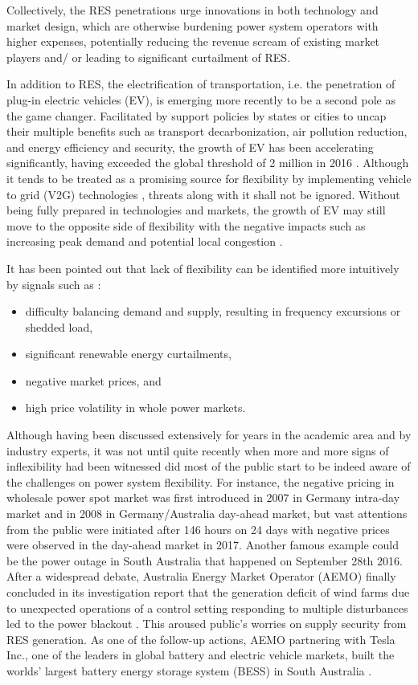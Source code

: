 Collectively, the RES penetrations urge innovations in both technology and market design, which are otherwise burdening power system operators with higher expenses, potentially reducing the revenue scream of existing market players and/ or leading to significant curtailment of RES.

In addition to RES, the electrification of transportation, i.e. the penetration of plug-in electric vehicles (EV), is emerging more recently to be a second pole as the game changer. Facilitated by support policies by states or cities to uncap their multiple benefits such as transport decarbonization, air pollution reduction, and energy efficiency and security, the growth of EV has been accelerating significantly, having exceeded the global threshold of 2 million in 2016 \cite{InternationalEnergyAgency2017}. Although it tends to be treated as a promising source for flexibility by implementing vehicle to grid (V2G) technologies \cite{Size2016,Habib2015,Foley2013}, threats along with it shall not be ignored. Without being fully prepared in technologies and markets, the growth of EV may still move to the opposite side of flexibility with the negative impacts such as increasing peak demand and potential local congestion \cite{Green2011,DBLP:journals/corr/PournarasJZFS17}.

It has been pointed out that lack of flexibility can be identified more intuitively by signals such as \cite{Cochran2014,Wang2017}:
\begin{itemize}
	\item difficulty balancing demand and supply, resulting in frequency excursions or shedded load,
	\item significant renewable energy curtailments,
	\item negative market prices, and
	\item high price volatility in whole power markets.
\end{itemize}

Although having been discussed extensively for years in the academic area and by industry experts, it was not until quite recently when more and more signs of inflexibility had been witnessed did most of the public start to be indeed aware of the challenges on power system flexibility. For instance, the negative pricing in wholesale power spot market was first introduced in 2007 in Germany intra-day market and in 2008 in Germany/Australia day-ahead market\cite{EPEX_negative_price}, but vast attentions from the public were initiated after 146 hours on 24 days with negative prices were observed in the day-ahead market in 2017. Another famous example could be the power outage in South Australia that happened on September 28th 2016. After a widespread debate, Australia Energy Market Operator (AEMO) finally concluded in its investigation report that the generation deficit of wind farms due to unexpected operations of a control setting responding to multiple disturbances led to the power blackout  \cite{AEMO2016SA}.  This aroused public's worries on supply security from RES generation. As one of the follow-up actions, AEMO partnering with Tesla Inc., one of the leaders in global battery and electric vehicle markets,  built the worlds' largest battery energy storage system (BESS) in South Australia \cite{AEMO_tesla}.

